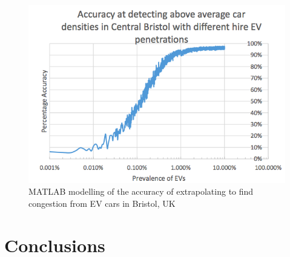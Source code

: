 \documentclass[conference]{IEEEtran}
\begin{document}
\begin{figure}[!htp]
\centering
\includegraphics[width=\columnwidth]{images/bristolcardensity.png}
\caption{MATLAB modelling of the accuracy of extrapolating to find
  congestion from EV cars in Bristol, UK}
\label{fig:bristolcardensity}
\end{figure}


\section{Conclusions} 
\end{document}
